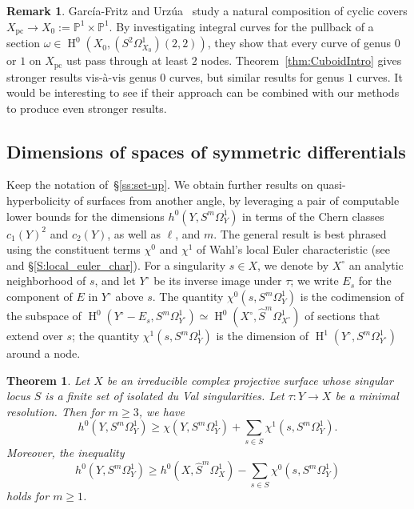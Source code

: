 \documentclass[12pt, reqno]{amsart}
\newtheorem{theorem}[lemma]{Theorem}
\theoremstyle{definition}
\newtheorem{remark}[lemma]{Remark}
\newcommand{\PP}{{\mathbb P}}
\DeclareMathOperator{\HH}{H}
\newcommand{\Xpc}{X_\mathrm{pc}}
\newcommand{\isom}{\simeq}
\numberwithin{equation}{section}
\numberwithin{table}{section}
\begin{document}
\begin{remark} Garc\'ia-Fritz and Urz\'ua~\cite{GarciaFritzUrzua} study a natural composition of cyclic covers $\Xpc \to X_0 := \PP^1\times \PP^1$.  By investigating integral curves for the pullback of a section $\omega \in \HH^0(X_0,(S^2\Omega^1_{X_0})(2,2))$, they show that every curve of genus $0$ or $1$ on $\Xpc$ ust pass through at least $2$ nodes. Theorem~\ref{thm:CuboidIntro} gives stronger results vis-\`a-vis genus $0$ curves, but similar results for genus $1$ curves.
It would be interesting to see if their approach can be combined with our methods to produce even stronger results. 
\end{remark}

\subsection{Dimensions of spaces of symmetric differentials}
Keep the notation of~\S\ref{ss:set-up}.  We obtain further results on quasi-hyperbolicity of surfaces from another angle, by leveraging a pair of computable lower bounds for the dimensions $h^0(Y,S^m\Omega^1_Y)$ in terms of the Chern classes $c_1(Y)^2$ and $c_2(Y)$, as well as $\ell$, and $m$.  The general result is best phrased using the constituent terms $\chi^0$ and $\chi^1$ of Wahl's local Euler characteristic (see~\cite{Wahl1993} and \S\ref{S:local_euler_char}).  For a singularity $s \in X$, we denote by $X^\circ$ an analytic neighborhood of $s$, and let $Y^\circ$ be its inverse image under $\tau$; we write $E_s$ for the component of $E$ in $Y^\circ$ above $s$. The quantity $\chi^0(s,S^m\Omega^1_{Y})$ is the codimension of the subspace of $\HH^0(Y^\circ-E_s,S^m\Omega^1_{Y^\circ}) \isom \HH^0(X^\circ,\hat S^m\Omega^1_{X^\circ})$ of sections that extend over $s$; the quantity $\chi^1(s,S^m\Omega^1_{Y})$ is the dimension of $\HH^1(Y^\circ,S^m\Omega^1_{Y^\circ})$ around a node. 

\begin{theorem}
\label{thm:main}
Let $X$ be an irreducible complex projective surface whose singular locus $S$ is a finite set of isolated du Val singularities. Let $\tau\colon Y \to X$ be a minimal resolution.
Then for $m\geq 3$, we have
\begin{equation}\label{E:h0Yestimate_chi}
h^0(Y,S^m\Omega^1_Y)\geq \chi(Y,S^m\Omega^1_Y)+\sum_{s\in S}\chi^1(s,S^m\Omega^1_{Y}).
\end{equation}
Moreover, the inequality
\begin{equation}\label{E:h0Yestimate_h0}
h^0(Y,S^m\Omega^1_Y)\geq h^0(X,\hat S^m\Omega^1_X) -\sum_{s\in S}\chi^0(s,S^m\Omega^1_{Y})
\end{equation}
holds for $m \geq 1$.
\end{theorem}
\end{document}
